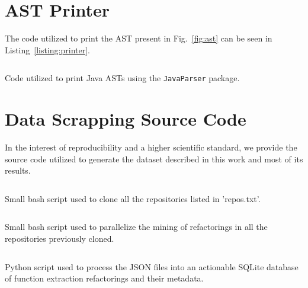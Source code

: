 
\chapter{AST Printer}
\label{an:astcoisas}


The code utilized to print the AST present in Fig.~\ref{fig:ast} can be seen in Listing~\ref{listing:printer}.


\begin{listing}[!ht]
\inputminted[linenos, ]{java}{conteudo/code/ast_printer.java}
\caption{Code utilized to print Java ASTs using the \texttt{JavaParser} package.}
\label{listing:printer}
\end{listing}


\chapter{Data Scrapping Source Code}
\label{an:code_data}


In the interest of reproducibility and a higher scientific standard, we provide the source code utilized to generate the dataset described in this work and most of its results.

\begin{listing}[!ht]
\inputminted[linenos, breaklines]{bash}{conteudo/code/clona_tudo.sh}
\caption{Small bash script used to clone all the repositories listed in 'repos.txt'.}
\label{listing:clona}
\end{listing}




\begin{listing}[!ht]
\inputminted[linenos, breaklines]{bash}{conteudo/code/mina_tudo.sh}
\caption{Small bash script used to parallelize the mining of refactorings in all the repositories previously cloned.}
\label{listing:mina}
\end{listing}

\newpage


\begin{code}
\inputminted[linenos, breaklines]{python}{conteudo/code/create_db.py}
\caption{Python script used to process the JSON files into an actionable SQLite database of function extraction refactorings and their metadata.}
\label{listing:db}
\end{code}



